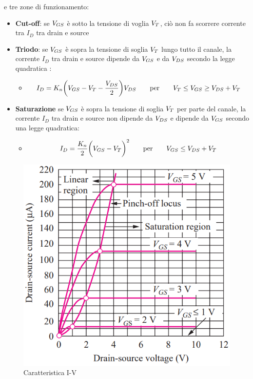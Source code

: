 e tre zone di funzionamento:

\begin{itemize}
    \item[] \textbf{Cut-off}: se $V_{GS}$ è sotto la tensione di voglia $V_{T}$, ciò non fa scorrere corrente tra $I_D$ tra drain e source
    \item[] \textbf{Triodo}: se $V_{GS}$ è sopra la tensione di soglia $V_{T}$ lungo tutto il canale, la corrente $I_D $ tra	drain	e	source	dipende	da	$V_{GS}$ e	da	$V_{DS}$ secondo	la	legge	quadratica :
    \begin{itemize}
        \item[] \begin{equation*}
            I_D = K_n\biggl(V_{GS}-V_T-\frac{V_{DS}}{2}\biggl)V_{DS}\qquad \text{per} \qquad V_{T} \leq V_{GS} \geq V_{DS} + V_{T}
        \end{equation*}
    \end{itemize}

    \item[] \textbf{Saturazione} se $V_{GS}$ è	sopra	la	tensione	di	soglia $V_{T}$ per	parte	
    del	canale,	la	corrente $I_D$ tra	drain	e	source	non	dipende	da $V_{DS}$ e dipende da $V_{GS}$ secondo una legge quadratica:
    \begin{itemize}
        \item[] \begin{equation*}
                I_D = \frac{K_n}{2}\biggl(V_{GS} - V_T \biggl)^2\qquad \text{per} \qquad V_{GS} \leq V_{DS} + V_{T}
        \end{equation*}
    \end{itemize}

\end{itemize}

\begin{figure}[htbp]
    \centering
    \includegraphics[width=0.45\linewidth]{img/recap.png}
    \caption{Caratteristica I-V}
    
\end{figure}

